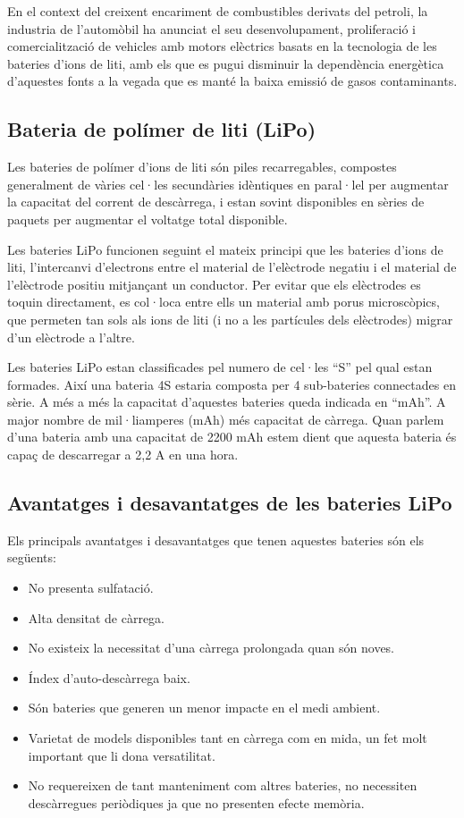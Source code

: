 En el context del creixent encariment de combustibles derivats del petroli, la industria de l'automòbil ha anunciat el seu desenvolupament, proliferació i comercialització de vehicles amb motors elèctrics basats en la tecnologia de les bateries d’ions de liti, amb els que es pugui disminuir la dependència energètica d’aquestes fonts a la vegada que es manté la baixa emissió de gasos contaminants.

\subsection{Bateria de polímer de liti (LiPo)}

Les bateries de polímer d'ions de liti són piles recarregables, compostes generalment de vàries cel·les secundàries idèntiques en paral·lel per augmentar la capacitat del corrent de descàrrega, i estan sovint disponibles en sèries de paquets per augmentar el voltatge total disponible.

Les bateries LiPo funcionen seguint el mateix principi que les bateries d'ions de liti, l’intercanvi d’electrons entre el material de l'elèctrode \newline negatiu i el material de l'elèctrode positiu mitjançant un conductor. Per evitar que els elèctrodes es toquin directament, es col·loca entre ells un material amb porus microscòpics, que permeten tan sols als ions de liti (i no a les partícules dels elèctrodes) migrar d’un elèctrode a l'altre.

Les bateries LiPo estan classificades pel numero de cel·les “S” pel qual estan formades. Així una bateria 4S estaria composta per 4 sub-bateries connectades en sèrie. A més a més la capacitat d’aquestes bateries queda indicada en “mAh”. A major nombre de mil·liamperes (mAh) més capacitat de càrrega. Quan parlem d’una bateria amb una capacitat de 2200 mAh estem dient que aquesta bateria és capaç de descarregar a 2,2 A en una hora.

\subsection{Avantatges i desavantatges de les bateries LiPo}

Els principals avantatges i desavantatges que tenen aquestes bateries són els següents:
\begin{itemize}
    \item No presenta sulfatació.
    \item Alta densitat de càrrega.
    \item No existeix la necessitat d'una càrrega prolongada quan són noves.
    \item Índex d'auto-descàrrega baix.
    \item Són bateries que generen un menor impacte en el medi ambient.
    \item Varietat de models disponibles tant en càrrega com en mida, un fet molt important que li dona versatilitat.
    \item No requereixen de tant manteniment com altres bateries, no necessiten descàrregues periòdiques ja que no presenten efecte memòria.
\end{itemize}

